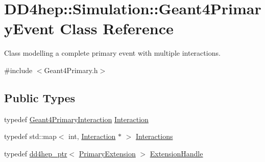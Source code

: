 \hypertarget{class_d_d4hep_1_1_simulation_1_1_geant4_primary_event}{}\section{D\+D4hep\+:\+:Simulation\+:\+:Geant4\+Primary\+Event Class Reference}
\label{class_d_d4hep_1_1_simulation_1_1_geant4_primary_event}


Class modelling a complete primary event with multiple interactions.  




{\ttfamily \#include $<$Geant4\+Primary.\+h$>$}

\subsection*{Public Types}
\begin{DoxyCompactItemize}
\item 
typedef \hyperlink{class_d_d4hep_1_1_simulation_1_1_geant4_primary_interaction}{Geant4\+Primary\+Interaction} \hyperlink{class_d_d4hep_1_1_simulation_1_1_geant4_primary_event_afe42410b9331b521808a49120f402bd9}{Interaction}
\item 
typedef std\+::map$<$ int, \hyperlink{class_d_d4hep_1_1_simulation_1_1_geant4_primary_event_afe42410b9331b521808a49120f402bd9}{Interaction} $\ast$ $>$ \hyperlink{class_d_d4hep_1_1_simulation_1_1_geant4_primary_event_adae96b166507159c2dd92b4e20352a52}{Interactions}
\item 
typedef \hyperlink{class_d_d4hep_1_1dd4hep__ptr}{dd4hep\+\_\+ptr}$<$ \hyperlink{class_d_d4hep_1_1_simulation_1_1_primary_extension}{Primary\+Extension} $>$ \hyperlink{class_d_d4hep_1_1_simulation_1_1_geant4_primary_event_acfe0b3b7ad6f183fe75a6539b4470418}{Extension\+Handle}
\end{DoxyCompactItemize}
